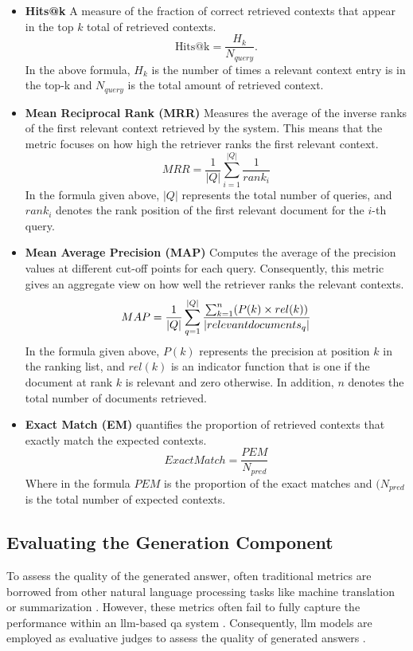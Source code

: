 \begin{itemize}
    \item \textbf{Hits@k} A measure of the fraction of correct retrieved contexts that appear in the top \(k\) total of retrieved contexts.
    \[
    \text{Hits@k} = \frac{H_k}{N_{query}}.
    \]
    In the above formula, \( H_k \) is the number of times a relevant context entry is in the top-k and \(N_{query}\) is the total amount of retrieved context.

    \item \textbf{Mean Reciprocal Rank (MRR)} Measures the average of the inverse ranks of the first relevant context retrieved by the system. This means that the metric focuses on how high the retriever ranks the first relevant context.
    \[
    MRR = \frac{1}{|Q|} \sum^{|Q|}_{i=1} \frac{1}{rank_i}
    \]
    In the formula given above, \(|Q|\) represents the total number of queries, and \(rank_i\) denotes the rank position of the first relevant document for the \(i\)-th query.
    
    \item \textbf{Mean Average Precision (MAP)} Computes the average of the precision values at different cut-off points for each query. Consequently, this metric gives an aggregate view on how well the retriever ranks the relevant contexts.
    \[
    MAP =  \frac{1}{|Q|} \sum^{|Q|}_{q=1} \frac{\sum^n_{k=1} (P(k) \times rel(k))}{|relevant \space documents_q|} 
    \]
    In the formula given above, \(P(k)\) represents the precision at position \(k\) in the ranking list, and \(rel(k)\) is an indicator function that is one if the document at rank \(k\) is relevant and zero otherwise. In addition, \(n\) denotes the total number of documents retrieved.

    \item \textbf{Exact Match (EM)} quantifies the proportion of retrieved contexts that exactly match the expected contexts.
    \[
    Exact Match = \frac{PEM}{N_{pred}}
    \]
    Where in the formula \(PEM\) is the proportion of the exact matches and \((N_{pred}\) is the total number of expected contexts.
\end{itemize}


\subsection{Evaluating the Generation Component}

To assess the quality of the generated answer, often traditional metrics are borrowed from other natural language processing tasks like machine translation or summarization \textcite{yu_evaluation_2024,ibrahim_survey_2024,alinejad_evaluating_2024,alinejad_evaluating_2024}. However, these metrics often fail to fully capture the performance within an \gls{llm}-based \gls{qa} system \cite{alinejad_evaluating_2024}. Consequently, \gls{llm} models are employed as evaluative judges to assess the quality of generated answers \cite{es_ragas_2023}.

